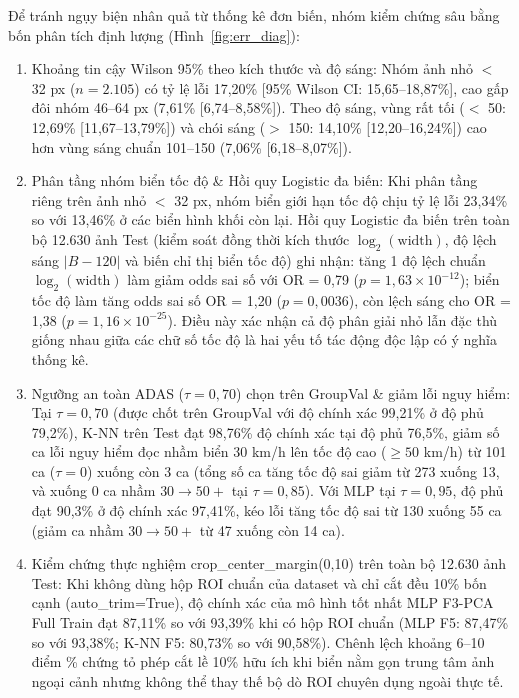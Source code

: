 \documentclass[conference]{IEEEtran}
\begin{document}
Để tránh ngụy biện nhân quả từ thống kê đơn biến, nhóm kiểm chứng sâu bằng bốn phân tích định lượng (Hình~\ref{fig:err_diag}):
\begin{enumerate}
  \item Khoảng tin cậy Wilson 95\% theo kích thước và độ sáng: Nhóm ảnh nhỏ $<$ 32 px ($n=2.105$) có tỷ lệ lỗi 17,20\% [95\% Wilson CI: 15,65--18,87\%], cao gấp đôi nhóm 46--64 px (7,61\% [6,74--8,58\%]). Theo độ sáng, vùng rất tối ($<$ 50: 12,69\% [11,67--13,79\%]) và chói sáng ($>$ 150: 14,10\% [12,20--16,24\%]) cao hơn vùng sáng chuẩn 101--150 (7,06\% [6,18--8,07\%]).
  \item Phân tầng nhóm biển tốc độ \& Hồi quy Logistic đa biến: Khi phân tầng riêng trên ảnh nhỏ $<$ 32 px, nhóm biển giới hạn tốc độ chịu tỷ lệ lỗi 23,34\% so với 13,46\% ở các biển hình khối còn lại. Hồi quy Logistic đa biến trên toàn bộ 12.630 ảnh Test (kiểm soát đồng thời kích thước $\log_2(\text{width})$, độ lệch sáng $|B-120|$ và biến chỉ thị biển tốc độ) ghi nhận: tăng 1 độ lệch chuẩn $\log_2(\text{width})$ làm giảm odds sai số với OR = 0,79 ($p = 1{,}63\times 10^{-12}$); biển tốc độ làm tăng odds sai số OR = 1,20 ($p = 0,0036$), còn lệch sáng cho OR = 1,38 ($p = 1{,}16\times 10^{-25}$). Điều này xác nhận cả độ phân giải nhỏ lẫn đặc thù giống nhau giữa các chữ số tốc độ là hai yếu tố tác động độc lập có ý nghĩa thống kê.
  \item Ngưỡng an toàn ADAS ($\tau = 0{,}70$) chọn trên GroupVal \& giảm lỗi nguy hiểm: Tại $\tau=0{,}70$ (được chốt trên GroupVal với độ chính xác 99,21\% ở độ phủ 79,2\%), K-NN trên Test đạt 98,76\% độ chính xác tại độ phủ 76,5\%, giảm số ca lỗi nguy hiểm đọc nhầm biển 30 km/h lên tốc độ cao ($\ge 50$ km/h) từ 101 ca ($\tau=0$) xuống còn 3 ca (tổng số ca tăng tốc độ sai giảm từ 273 xuống 13, và xuống 0 ca nhầm $30\rightarrow 50+$ tại $\tau=0{,}85$). Với MLP tại $\tau=0{,}95$, độ phủ đạt 90,3\% ở độ chính xác 97,41\%, kéo lỗi tăng tốc độ sai từ 130 xuống 55 ca (giảm ca nhầm $30\rightarrow 50+$ từ 47 xuống còn 14 ca).
  \item Kiểm chứng thực nghiệm crop\_center\_margin(0,10) trên toàn bộ 12.630 ảnh Test: Khi không dùng hộp ROI chuẩn của dataset và chỉ cắt đều 10\% bốn cạnh (auto\_trim=True), độ chính xác của mô hình tốt nhất MLP F3-PCA Full Train đạt 87,11\% so với 93,39\% khi có hộp ROI chuẩn (MLP F5: 87,47\% so với 93,38\%; K-NN F5: 80,73\% so với 90,58\%). Chênh lệch khoảng 6--10 điểm \% chứng tỏ phép cắt lề 10\% hữu ích khi biển nằm gọn trung tâm ảnh ngoại cảnh nhưng không thể thay thế bộ dò ROI chuyên dụng ngoài thực tế.
\end{enumerate}
\end{document}
